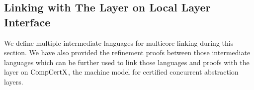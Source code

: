 \subsection{Linking with The Layer on Local Layer Interface}
\label{chapter:linking:subsec:linking-with-the-layer-on-local-layer-interface}

We define multiple intermediate languages for multicore linking during this section.
We have also provided the refinement proofs between those intermediate languages which can be further used 
to link those languages and proofs with the layer on $\mathrm{CompCertX}$, the machine model for 
certified concurrent abstraction layers. 

